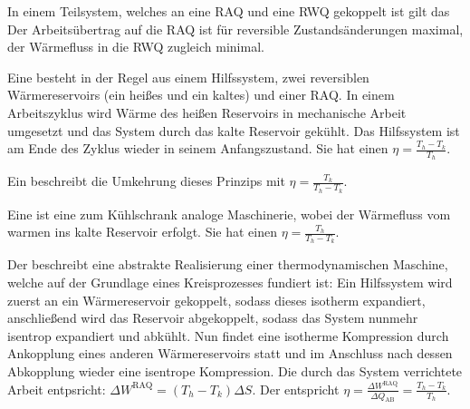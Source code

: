 \begin{summary}
   In einem Teilsystem, welches an eine RAQ und eine RWQ gekoppelt ist gilt das
    Der Arbeitsübertrag auf die RAQ ist für reversible Zustandsänderungen maximal, der Wärmefluss in die RWQ zugleich minimal. 

    Eine  besteht in der Regel aus einem Hilfssystem, zwei reversiblen Wärmereservoirs (ein heißes und ein kaltes) und einer RAQ.
    In einem Arbeitszyklus wird Wärme des heißen Reservoirs in mechanische Arbeit umgesetzt und das System durch das kalte Reservoir gekühlt. Das Hilfssystem ist am Ende des Zyklus wieder in seinem Anfangszustand.
    Sie hat einen  $\eta=\frac{T_h-T_k}{T_h}$.

    Ein  beschreibt die Umkehrung dieses Prinzips mit  $\eta=\frac{T_k}{T_h-T_k}$.

    Eine  ist eine zum Kühlschrank analoge Maschinerie, wobei der Wärmefluss vom warmen ins kalte Reservoir erfolgt. Sie hat einen  $\eta=\frac{T_h}{T_h-T_k}$.

    Der  beschreibt eine abstrakte Realisierung einer thermodynamischen Maschine, welche auf der Grundlage eines Kreisprozesses fundiert ist: Ein Hilfssystem wird zuerst an ein Wärmereservoir gekoppelt, sodass dieses isotherm expandiert, anschließend wird das Reservoir abgekoppelt, sodass das System nunmehr isentrop expandiert und abkühlt. Nun findet eine isotherme Kompression durch Ankopplung eines anderen Wärmereservoirs statt und im Anschluss nach dessen Abkopplung wieder eine isentrope Kompression. Die durch das System verrichtete Arbeit entpsricht: $\Delta W^\mathrm{RAQ}=(T_h-T_k)\Delta S$. Der  entspricht $\eta=\frac{\Delta W^\mathrm{RAQ}}{\Delta Q_\mathrm{AB}}=\frac{T_h-T_k}{T_h}$.

   
    


\end{summary}






